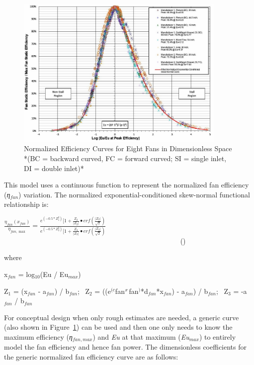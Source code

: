 \begin{figure}[hbtp] %
\centering
\includegraphics[width=0.9\textwidth, height=0.9\textheight, keepaspectratio=true]{media/image4895.png}
\caption{Normalized Efficiency Curves for Eight Fans in Dimensionless Space *(BC = backward curved, FC = forward curved; SI = single inlet, DI = double inlet)* \protect \label{fig:normalized-efficiency-curves-for-eight-fans}}
\end{figure}

This model uses a continuous function to represent the normalized fan efficiency (\emph{η\(_{fan}\)}) variation. The normalized exponential-conditioned skew-normal functional relationship is:

\(\frac{{{\eta_{fan}}({x_{fan}})}}{{{\eta_{fan,\max }}}} = \frac{{{e^{( - 0.5*Z_1^2)}}[1 + \frac{{{Z_2}}}{{\left| {{Z_2}} \right|}} \bullet erf\left( {\frac{{\left| {{Z_2}} \right|}}{{\sqrt 2 }}} \right)}}{{{e^{( - 0.5*Z_3^2)}}[1 + \frac{{{Z_3}}}{{\left| {{Z_3}} \right|}} \bullet erf\left( {\frac{{\left| {{Z_3}} \right|}}{{\sqrt 2 }}} \right)}}\) ~~~~~~~~~~~~~~~~~~~~~~~~~~~~~~~~~~~~~~~~~~~~~~~~~~ ()

where

x\(_{fan}\) = log\(_{10}\)(Eu / Eu\(_{max}\))

Z\(_{1}\) = (x\(_{fan}\) - a\(_{fan}\)) / b\(_{fan}\);~ Z\(_{2}\) = ((e\(^{(c}\)fan\(^{\*x}\)fan\(^{)}\)*d\(_{fan}\)*x\(_{fan}\)) - a\(_{fan}\)) / b\(_{fan}\);~ Z\(_{3}\) = -a\(_{fan}\) / b\(_{fan}\)

For conceptual design when only rough estimates are needed, a generic curve (also shown in Figure~\ref{fig:normalized-efficiency-curves-for-eight-fans}) can be used and then one only needs to know the maximum efficiency (\emph{η\(_{fan,max}\)}) and \emph{Eu} at that maximum (\emph{Eu\(_{max}\)}) to entirely model the fan efficiency and hence fan power. The dimensionless coefficients for the generic normalized fan efficiency curve are as follows:

